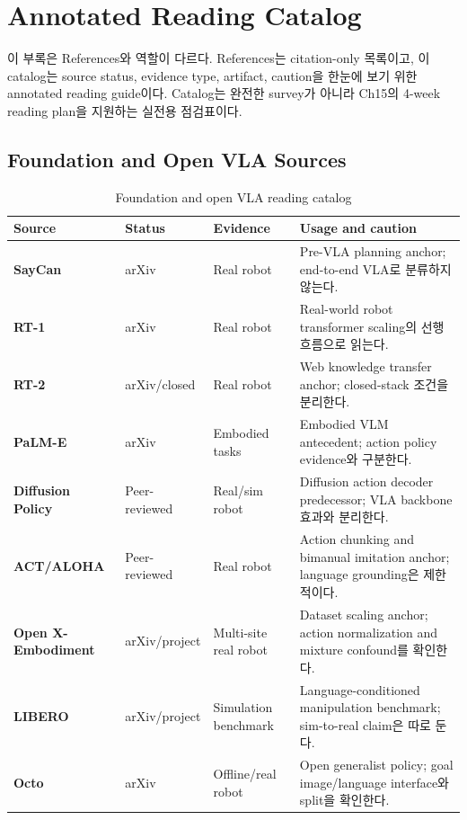 \chapter{Annotated Reading Catalog}
\label{app:reading_catalog}

이 부록은 References와 역할이 다르다. References는 citation-only 목록이고, 이 catalog는 source status, evidence type, artifact, caution을 한눈에 보기 위한 annotated reading guide이다. Catalog는 완전한 survey가 아니라 Ch15의 4-week reading plan을 지원하는 실전용 점검표이다.

\section{Foundation and Open VLA Sources}

\begin{table}[h]
  \centering
  \small
  \caption{Foundation and open VLA reading catalog}
  \label{tab:appendix_reading_catalog_foundation}
  \begin{tabularx}{\textwidth}{>{\bfseries}p{28mm}p{23mm}p{26mm}X}
    \toprule
    Source & Status & Evidence & Usage and caution \\
    \midrule
    SayCan \citep{saycan} & arXiv & Real robot & Pre-VLA planning anchor; end-to-end VLA로 분류하지 않는다. \\
    RT-1 \citep{rt1} & arXiv & Real robot & Real-world robot transformer scaling의 선행 흐름으로 읽는다. \\
    RT-2 \citep{rt2} & arXiv/closed & Real robot & Web knowledge transfer anchor; closed-stack 조건을 분리한다. \\
    PaLM-E \citep{palme} & arXiv & Embodied tasks & Embodied VLM antecedent; action policy evidence와 구분한다. \\
    Diffusion Policy \citep{diffusionpolicy} & Peer-reviewed & Real/sim robot & Diffusion action decoder predecessor; VLA backbone 효과와 분리한다. \\
    ACT/ALOHA \citep{aloha} & Peer-reviewed & Real robot & Action chunking and bimanual imitation anchor; language grounding은 제한적이다. \\
    Open X-Embodiment \citep{openx} & arXiv/project & Multi-site real robot & Dataset scaling anchor; action normalization and mixture confound를 확인한다. \\
    LIBERO \citep{libero} & arXiv/project & Simulation benchmark & Language-conditioned manipulation benchmark; sim-to-real claim은 따로 둔다. \\
    Octo \citep{octo} & arXiv & Offline/real robot & Open generalist policy; goal image/language interface와 split을 확인한다. \\

\end{tabularx}
\end{table}
